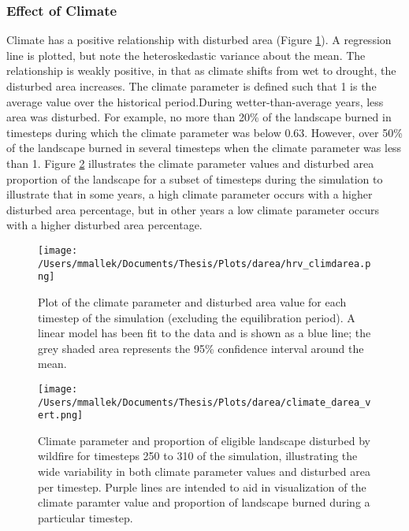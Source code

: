 \subsubsection{Effect of Climate} 
Climate has a positive relationship with disturbed area (Figure \ref{fig:climate_darea}). A regression line is plotted, but note the heteroskedastic variance about the mean. The relationship is weakly positive, in that as climate shifts from wet to drought, the disturbed area increases. The climate parameter is defined such that 1 is the average value over the historical period.During wetter-than-average years, less area was disturbed. For example, no more than 20\% of the landscape burned in timesteps during which the climate parameter was below 0.63. However, over 50\% of the landscape burned in several timesteps when the climate parameter was less than 1. Figure \ref{fig:compare_clim_darea} illustrates the climate parameter values and disturbed area proportion of the landscape for a subset of timesteps during the simulation to illustrate that in some years, a high climate parameter occurs with a higher disturbed area percentage, but in other years a low climate parameter occurs with a higher disturbed area percentage.

\begin{figure}[!htbp]
  \centering
    \texttt{[image: /Users/mmallek/Documents/Thesis/Plots/darea/hrv\_climdarea.png]}
  \caption{Plot of the climate parameter and disturbed area value for each timestep of the simulation (excluding the equilibration period). A linear model has been fit to the data and is shown as a blue line; the grey shaded area represents the 95\% confidence interval around the mean.}
  \label{fig:climate_darea}
\end{figure}


\begin{figure}[!htbp]
\centering
\texttt{[image: /Users/mmallek/Documents/Thesis/Plots/darea/climate\_darea\_vert.png]}
\caption{Climate parameter and proportion of eligible landscape disturbed by wildfire for timesteps 250 to 310 of the simulation, illustrating the wide variability in both climate parameter values and disturbed area per timestep. Purple lines are intended to aid in visualization of the climate paramter value and proportion of landscape burned during a particular timestep.}
\label{fig:compare_clim_darea}
\end{figure}

